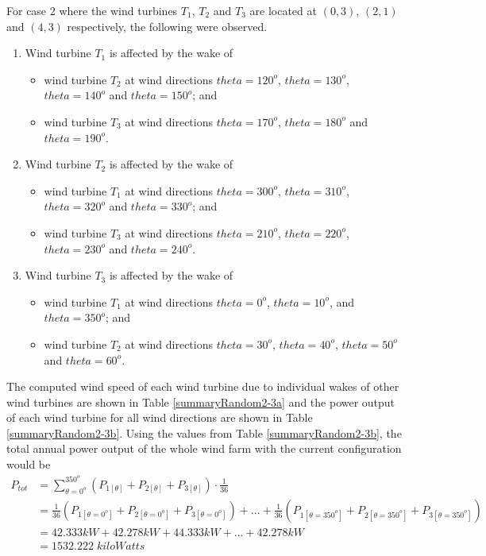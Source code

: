     For case 2 where the wind turbines $T_1$, $T_2$ and $T_3$ are located at $(0,3)$, $(2,1)$ and $(4,3)$ respectively, the following were observed.
    \begin{enumerate}[label=(\subscript{u}{{\arabic*}})]
        \item Wind turbine $T_1$ is affected by the wake of
            \begin{itemize}
                \item wind turbine $T_2$ at wind directions $theta=120^o$, $theta=130^o$, $theta=140^o$ and $theta=150^o$; and
                \item wind turbine $T_3$ at wind directions $theta=170^o$, $theta=180^o$ and $theta=190^o$.
            \end{itemize}
        \item Wind turbine $T_2$ is affected by the wake of
            \begin{itemize}
                \item wind turbine $T_1$ at wind directions $theta=300^o$, $theta=310^o$, $theta=320^o$ and $theta=330^o$; and
                \item wind turbine $T_3$ at wind directions $theta=210^o$, $theta=220^o$, $theta=230^o$ and $theta=240^o$.
            \end{itemize}
        \item Wind turbine $T_3$ is affected by the wake of
            \begin{itemize}
                \item wind turbine $T_1$ at wind directions $theta=0^o$, $theta=10^o$, and $theta=350^o$; and
                \item wind turbine $T_2$ at wind directions $theta=30^o$, $theta=40^o$, $theta=50^o$ and $theta=60^o$.
            \end{itemize}
    \end{enumerate}
    
    The computed wind speed of each wind turbine due to individual wakes of other wind turbines are shown in Table \ref{summaryRandom2-3a} and the power output of each wind turbine for all wind directions are shown in Table \ref{summaryRandom2-3b}. Using the values from Table \ref{summaryRandom2-3b}, the total annual power output of the whole wind farm with the current configuration would be
    \begin{align*}
        P_{tot}
        &= \sum_{\theta=0^o}^{350^o} \left( P_{1[\theta]} + P_{2[\theta]} + P_{3[\theta]} \right) \cdot \frac{1}{36} \\
        &= \frac{1}{36}\left( P_{1[\theta=0^o]} + P_{2[\theta=0^o]} + P_{3[\theta=0^o]} \right) +...+ \frac{1}{36}\left( P_{1[\theta=350^o]} + P_{2[\theta=350^o]} + P_{3[\theta=350^o]} \right) \\
        &= 42.333kW + 42.278kW + 44.333kW +...+ 42.278kW \\
        &= 1532.222\;kiloWatts
    \end{align*}
    
